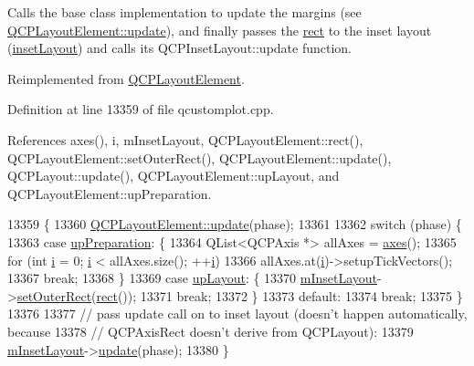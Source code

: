 Calls the base class implementation to update the margins (see \hyperlink{class_q_c_p_layout_element_a929c2ec62e0e0e1d8418eaa802e2af9b}{Q\+C\+P\+Layout\+Element\+::update}), and finally passes the \hyperlink{class_q_c_p_layout_element_affdfea003469aac3d0fac5f4e06171bc}{rect} to the inset layout (\hyperlink{class_q_c_p_axis_rect_a4114887c7141b59650b7488f930993e5}{inset\+Layout}) and calls its Q\+C\+P\+Inset\+Layout\+::update function. 

Reimplemented from \hyperlink{class_q_c_p_layout_element_a929c2ec62e0e0e1d8418eaa802e2af9b}{Q\+C\+P\+Layout\+Element}.



Definition at line 13359 of file qcustomplot.\+cpp.



References axes(), i, m\+Inset\+Layout, Q\+C\+P\+Layout\+Element\+::rect(), Q\+C\+P\+Layout\+Element\+::set\+Outer\+Rect(), Q\+C\+P\+Layout\+Element\+::update(), Q\+C\+P\+Layout\+::update(), Q\+C\+P\+Layout\+Element\+::up\+Layout, and Q\+C\+P\+Layout\+Element\+::up\+Preparation.


\begin{DoxyCode}
13359                                           \{
13360   \hyperlink{class_q_c_p_layout_element_a929c2ec62e0e0e1d8418eaa802e2af9b}{QCPLayoutElement::update}(phase);
13361 
13362   \textcolor{keywordflow}{switch} (phase) \{
13363   \textcolor{keywordflow}{case} \hyperlink{class_q_c_p_layout_element_a0d83360e05735735aaf6d7983c56374dad6119882eba136357c2f627992e527d3}{upPreparation}: \{
13364     QList<QCPAxis *> allAxes = \hyperlink{class_q_c_p_axis_rect_a18dcdc0dd6c7520bc9f3d15a7a3feec2}{axes}();
13365     \textcolor{keywordflow}{for} (\textcolor{keywordtype}{int} \hyperlink{_comparision_pictures_2_createtest_image_8m_a6f6ccfcf58b31cb6412107d9d5281426}{i} = 0; \hyperlink{_comparision_pictures_2_createtest_image_8m_a6f6ccfcf58b31cb6412107d9d5281426}{i} < allAxes.size(); ++\hyperlink{_comparision_pictures_2_createtest_image_8m_a6f6ccfcf58b31cb6412107d9d5281426}{i})
13366       allAxes.at(\hyperlink{_comparision_pictures_2_createtest_image_8m_a6f6ccfcf58b31cb6412107d9d5281426}{i})->setupTickVectors();
13367     \textcolor{keywordflow}{break};
13368   \}
13369   \textcolor{keywordflow}{case} \hyperlink{class_q_c_p_layout_element_a0d83360e05735735aaf6d7983c56374da5d1ccf5d79967c232c3c511796860045}{upLayout}: \{
13370     \hyperlink{class_q_c_p_axis_rect_a255240399e0fd24baad80cbbe46f698a}{mInsetLayout}->\hyperlink{class_q_c_p_layout_element_a38975ea13e36de8e53391ce41d94bc0f}{setOuterRect}(\hyperlink{class_q_c_p_layout_element_affdfea003469aac3d0fac5f4e06171bc}{rect}());
13371     \textcolor{keywordflow}{break};
13372   \}
13373   \textcolor{keywordflow}{default}:
13374     \textcolor{keywordflow}{break};
13375   \}
13376 
13377   \textcolor{comment}{// pass update call on to inset layout (doesn't happen automatically, because}
13378   \textcolor{comment}{// QCPAxisRect doesn't derive from QCPLayout):}
13379   \hyperlink{class_q_c_p_axis_rect_a255240399e0fd24baad80cbbe46f698a}{mInsetLayout}->\hyperlink{class_q_c_p_layout_a34ab477e820537ded7bade4399c482fd}{update}(phase);
13380 \}
\end{DoxyCode}


